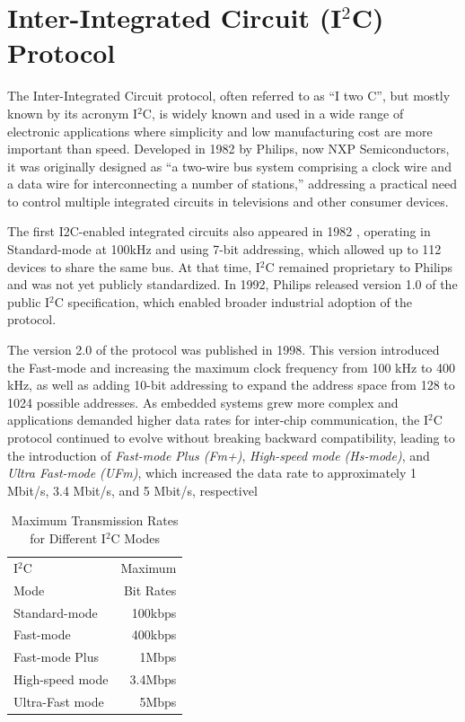 \section{\texorpdfstring{Inter-Integrated Circuit (I$^2$C) Protocol}{Inter-Integrated Circuit (I2C) Protocol}}
\label{chap:Back_I2C}

The Inter-Integrated Circuit protocol, often referred to as “I two C”, but mostly 
known by its acronym I$^2$C, is widely known and used in a wide range of electronic 
applications where simplicity and low manufacturing cost are more important than 
speed. Developed in 1982 by Philips, now NXP Semiconductors, it was originally 
designed as “a two-wire bus system comprising a clock wire and a data wire for 
interconnecting a number of stations,” addressing a practical need to control multiple 
integrated circuits in televisions and other consumer devices.

The first I2C-enabled integrated circuits also appeared in 1982 \cite{I2CSpec2000}, operating in 
Standard-mode at 100kHz and using 7-bit addressing, which allowed up to 112 
devices to share the same bus. At that time, I$^2$C remained proprietary to Philips 
and was not yet publicly standardized. In 1992, Philips released version 1.0 of the 
public I$^2$C specification, which enabled broader industrial adoption of the protocol.

The version 2.0 of the protocol was published in 1998. This version introduced 
the Fast-mode and increasing the maximum clock frequency from 100 kHz to 400 
kHz, as well as adding 10-bit addressing to expand the address space from 128 to 
1024 possible addresses. As embedded systems grew more complex and applications 
demanded higher data rates for inter-chip communication, the I$^2$C protocol continued 
to evolve without breaking backward compatibility, leading to the introduction 
of \textit{Fast-mode Plus (Fm+)}, \textit{High-speed mode (Hs-mode)}, and \textit{Ultra Fast-mode (UFm)}, 
which increased the data rate to approximately 1 Mbit/s, 3.4 Mbit/s, and 5 Mbit/s, 
respectivel

\begin{table}[H]
    \centering
    \begin{tabular}{l r}
        \toprule
        I$^2$C  & Maximum   \\ 
        Mode    & Bit Rates \\        
        \midrule
        Standard-mode   & 100kbps   \\
        Fast-mode       & 400kbps   \\
        Fast-mode Plus  & 1Mbps     \\
        High-speed mode & 3.4Mbps   \\
        Ultra-Fast mode & 5Mbps     \\
        \bottomrule
    \end{tabular}

    \caption
        {
            Maximum Transmission Rates \\ 
            for Different I$^2$C Modes \cite{I2COverview}
        }
    \label{tab:i2c_transition_rate}
\end{table}

